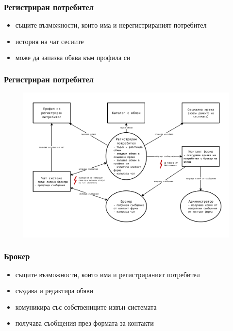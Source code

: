 \documentclass[12pt]{beamer}
\begin{document}
\begin{frame}[fragile]
\frametitle{Регистриран потребител}
		\begin{itemize}
		\item същите възможности, които има и нерегистрираният потребител
		\item история на чат сесиите
		\item може да запазва обява към профила си
		\end{itemize}
\end{frame}

\begin{frame}[fragile]
\frametitle{Регистриран потребител}
	\begin{figure}[h]
	\centering
	\includegraphics[scale=0.55]{a1-flow-reg}
	\end{figure}
\end{frame}

\begin{frame}[fragile]
\frametitle{Брокер}
		\begin{itemize}
		\item същите възможности, които има и регистрираният потребител
		\item създава и редактира обяви
		\item комуникира със собствениците извън системата
		\item получава съобщения през формата за контакти
		\end{itemize}
\end{frame}
\end{document}
